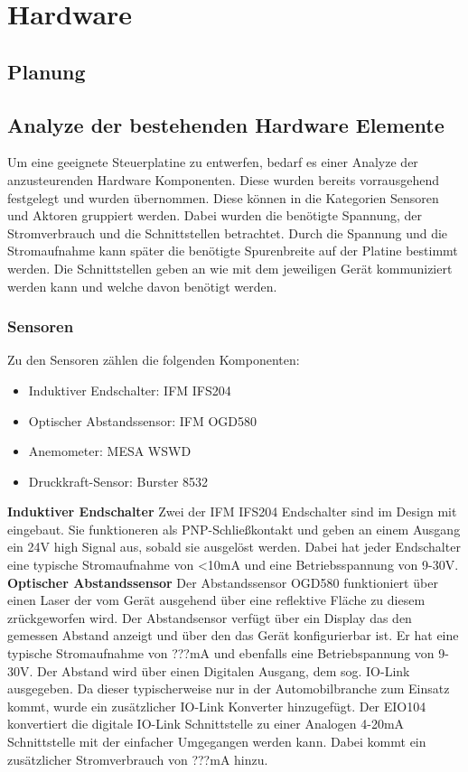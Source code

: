 \section{Hardware}
\subsection{Planung}
\subsection{Analyze der bestehenden Hardware Elemente}
Um eine geeignete Steuerplatine zu entwerfen, bedarf es einer Analyze der anzusteurenden Hardware Komponenten. Diese wurden bereits vorrausgehend festgelegt und wurden übernommen. Diese können in die Kategorien Sensoren und Aktoren gruppiert werden. Dabei wurden die benötigte Spannung, der Stromverbrauch und die Schnittstellen betrachtet. Durch die Spannung und die Stromaufnahme kann später die benötigte Spurenbreite auf der Platine bestimmt werden. Die Schnittstellen geben an wie mit dem jeweiligen Gerät kommuniziert werden kann und welche davon benötigt werden.\\

\subsubsection{Sensoren}
Zu den Sensoren zählen die folgenden Komponenten:
\begin{itemize}
	\item Induktiver Endschalter: IFM IFS204
	\item Optischer Abstandssensor: IFM OGD580
	\item Anemometer: MESA WSWD
	\item Druckkraft-Sensor: Burster 8532
\end{itemize}

\noindent\textbf{Induktiver Endschalter}\newline
Zwei der IFM IFS204 Endschalter sind im Design mit eingebaut. Sie funktioneren als PNP-Schließkontakt und geben an einem Ausgang ein 24V high Signal aus, sobald sie ausgelöst werden. Dabei hat jeder Endschalter eine typische Stromaufnahme von <10mA und eine Betriebsspannung von 9-30V.\\

\noindent\textbf{Optischer Abstandssensor}\newline
Der Abstandssensor OGD580 funktioniert über einen Laser der vom Gerät ausgehend über eine reflektive Fläche zu diesem zrückgeworfen wird. Der Abstandsensor verfügt über ein Display das den gemessen Abstand anzeigt und über den das Gerät konfigurierbar ist. Er hat eine typische Stromaufnahme von ???mA und ebenfalls eine Betriebspannung von 9-30V. Der Abstand wird über einen Digitalen Ausgang, dem sog. IO-Link ausgegeben. Da dieser typischerweise nur in der Automobilbranche zum Einsatz kommt, wurde ein zusätzlicher IO-Link Konverter hinzugefügt. Der EIO104 konvertiert die digitale IO-Link Schnittstelle zu einer Analogen 4-20mA Schnittstelle mit der einfacher Umgegangen werden kann. Dabei kommt ein zusätzlicher Stromverbrauch von ???mA hinzu.\\

